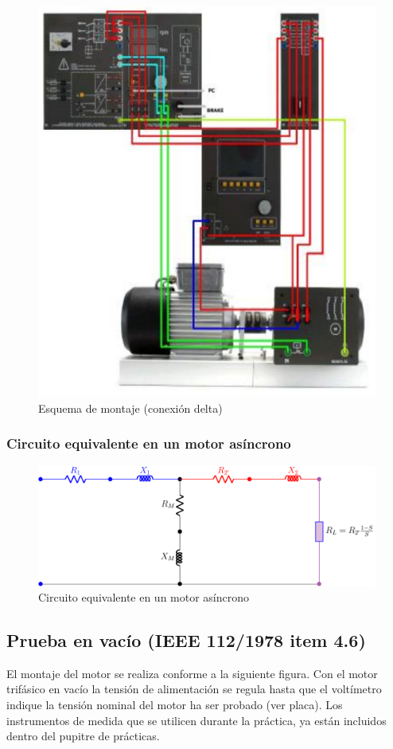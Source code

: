 \documentclass[a4paper,12pt]{article}
\begin{document}
\begin{figure}[H]
        \centering
        \includegraphics[scale = 0.83]{e2.png}
        \caption{Esquema de montaje (conexión delta)}
\end{figure}
\subsubsection{Circuito equivalente en un motor asíncrono}
    \begin{figure}[H]
        \centering
        \includegraphics[scale=0.88]{d1.pdf}
        \caption{Circuito equivalente en un motor asíncrono}
    \end{figure}
\subsection[Prueba en vacío IEEE 112/1978]{Prueba en vacío (IEEE 112/1978 item 4.6)}
El montaje del motor se realiza conforme a la siguiente figura. Con el motor trifásico en vacío la tensión de alimentación se regula hasta que el voltímetro indique la tensión nominal del motor ha ser probado (ver placa). Los instrumentos de medida que se utilicen durante la práctica, ya están incluidos dentro del pupitre de prácticas.
\end{document}
